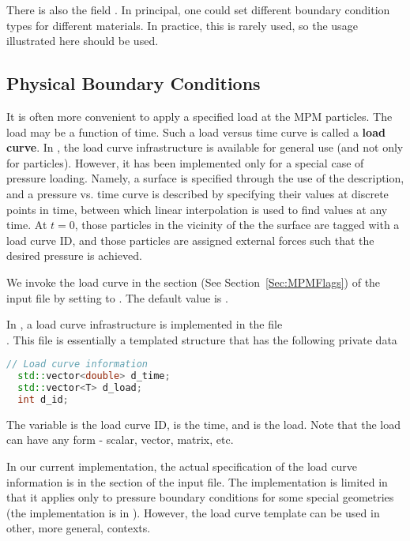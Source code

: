There is also the field .  In principal, one could
set different boundary condition types for different materials.  In practice,
this is rarely used, so the usage illustrated here should be used.

\subsection{Physical Boundary Conditions} \label{sec:PhysicalBCs}

It is often more convenient to apply a specified load at the MPM particles.
The load may be a function of time.  Such a load versus time curve is called
a {\bf load curve}.
In \Vaango, the load curve infrastructure is available for general use
(and not only for particles).  However, it has been implemented only for
a special case of pressure loading.  Namely, a surface is
specified through the use of the  description,
and a pressure vs. time curve is described by specifying their values
at discrete points in time, between which linear interpolation is used
to find values at any time.  At $t=0$, those particles in the vicinity
of the the surface are tagged with a load curve ID, and those particles
are assigned external forces such that the desired pressure is achieved.

We invoke the load curve in the  section
(See Section~\ref{Sec:MPMFlags}) of the input file
by setting  to .  The default value
is .

In \Vaango, a load curve infrastructure is implemented in the file \\
.  This file is essentially a templated
structure that has the following private data
\begin{lstlisting}[language=Cpp]
  // Load curve information 
  std::vector<double> d_time;
  std::vector<T> d_load;
  int d_id;
\end{lstlisting}
The variable  is the load curve ID,  is the time,
and  is the load.  Note that the load can have any form - scalar,
vector, matrix, etc.

In our current implementation, the actual specification of the load curve
information is in the  section of the input file.  The
implementation is limited in that it applies only to pressure boundary
conditions for some special geometries (the implementation is in
).  However, the load curve template can
be used in other, more general, contexts.

